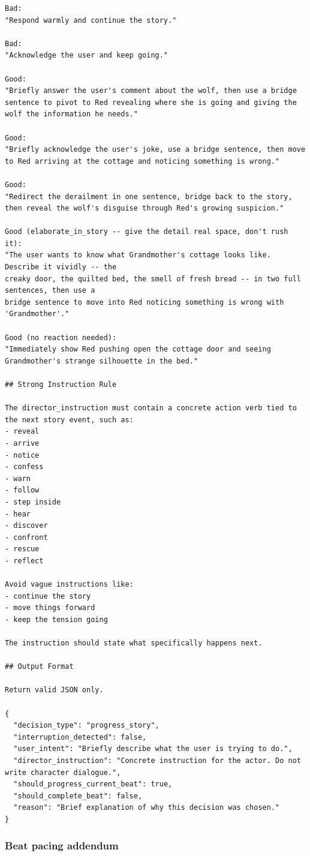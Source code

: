 \documentclass[10pt]{article}
\begin{document}
\begin{lstlisting}
Bad:
"Respond warmly and continue the story."

Bad:
"Acknowledge the user and keep going."

Good:
"Briefly answer the user's comment about the wolf, then use a bridge sentence to pivot to Red revealing where she is going and giving the wolf the information he needs."

Good:
"Briefly acknowledge the user's joke, use a bridge sentence, then move to Red arriving at the cottage and noticing something is wrong."

Good:
"Redirect the derailment in one sentence, bridge back to the story, then reveal the wolf's disguise through Red's growing suspicion."

Good (elaborate_in_story -- give the detail real space, don't rush it):
"The user wants to know what Grandmother's cottage looks like. Describe it vividly -- the
creaky door, the quilted bed, the smell of fresh bread -- in two full sentences, then use a
bridge sentence to move into Red noticing something is wrong with 'Grandmother'."

Good (no reaction needed):
"Immediately show Red pushing open the cottage door and seeing Grandmother's strange silhouette in the bed."

## Strong Instruction Rule

The director_instruction must contain a concrete action verb tied to the next story event, such as:
- reveal
- arrive
- notice
- confess
- warn
- follow
- step inside
- hear
- discover
- confront
- rescue
- reflect

Avoid vague instructions like:
- continue the story
- move things forward
- keep the tension going

The instruction should state what specifically happens next.

## Output Format

Return valid JSON only.

{
  "decision_type": "progress_story",
  "interruption_detected": false,
  "user_intent": "Briefly describe what the user is trying to do.",
  "director_instruction": "Concrete instruction for the actor. Do not write character dialogue.",
  "should_progress_current_beat": true,
  "should_complete_beat": false,
  "reason": "Brief explanation of why this decision was chosen."
}
\end{lstlisting}

\subsubsection{Beat pacing addendum}
\end{document}
